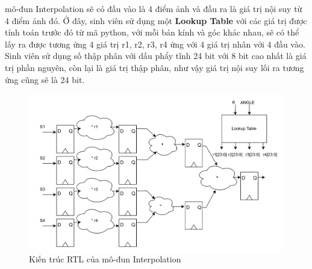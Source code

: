 mô-đun Interpolation sẽ có đầu vào là 4 điểm ảnh và đầu ra là giá trị nội suy từ 4 điểm ảnh đó. Ở đây, sinh viên sử dụng một \textbf{Lookup Table} với các giá trị được tính toán trước đó từ mã python, với mỗi bán kính và góc khác nhau, sẽ có thể lấy ra được tương ứng 4 giá trị r1, r2, r3, r4 ứng với 4 giá trị nhân với 4 đầu vào. Sinh viên sử dụng số thập phân với dấu phẩy tĩnh 24 bit với 8 bit cao nhất là giá trị phần nguyên, còn lại là giá trị thập phân, như vậy giá trị nội suy lối  ra tương ứng cũng sẽ là 24 bit. 
\begin{figure}[!ht]
	\centering
	\includegraphics[width=1\linewidth]{figures/interpolationRTL.png}
	\caption{Kiến trúc RTL của mô-đun Interpolation}
	\label{fig:interpolationRTL}
\end{figure}
